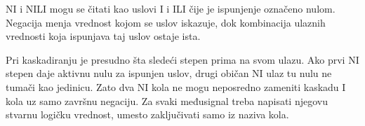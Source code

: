 
NI i NILI mogu se čitati kao uslovi I i ILI čije je ispunjenje označeno nulom. Negacija menja vrednost kojom se uslov iskazuje, dok kombinacija ulaznih vrednosti koja ispunjava taj uslov ostaje ista.

Pri kaskadiranju je presudno šta sledeći stepen prima na svom ulazu. Ako prvi NI stepen daje aktivnu nulu za ispunjen uslov, drugi običan NI ulaz tu nulu ne tumači kao jedinicu. Zato dva NI kola ne mogu neposredno zameniti kaskadu I kola uz samo završnu negaciju. Za svaki međusignal treba napisati njegovu stvarnu logičku vrednost, umesto zaključivati samo iz naziva kola.
